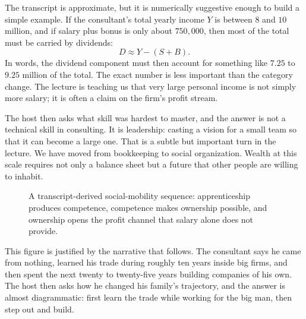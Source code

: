 The transcript is approximate, but it is numerically suggestive enough to build a simple example. If the consultant's total yearly income \(Y\) is between \(8\) and \(10\) million, and if salary plus bonus is only about \(750{,}000\), then most of the total must be carried by dividends:
\begin{equation}
D \approx Y-(S+B).
\end{equation}
In words, the dividend component must then account for something like \(7.25\) to \(9.25\) million of the total. The exact number is less important than the category change. The lecture is teaching us that very large personal income is not simply more salary; it is often a claim on the firm's profit stream.

The host then asks what skill was hardest to master, and the answer is not a technical skill in consulting. It is leadership: casting a vision for a small team so that it can become a large one. That is a subtle but important turn in the lecture. We have moved from bookkeeping to social organization. Wealth at this scale requires not only a balance sheet but a future that other people are willing to inhabit.

\begin{figure}[h]
\centering
{}
\caption{A transcript-derived social-mobility sequence: apprenticeship produces competence, competence makes ownership possible, and ownership opens the profit channel that salary alone does not provide.}
\end{figure}

This figure is justified by the narrative that follows. The consultant says he came from nothing, learned his trade during roughly ten years inside big firms, and then spent the next twenty to twenty-five years building companies of his own. The host then asks how he changed his family's trajectory, and the answer is almost diagrammatic: first learn the trade while working for the big man, then step out and build.

